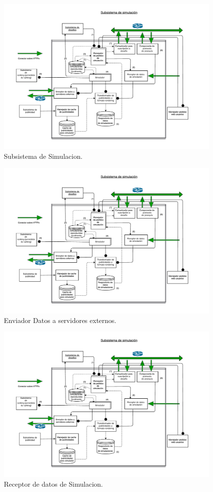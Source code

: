 \begin{figure}[H]
  \includegraphics[width=1.1\textwidth, page=1, clip, trim=10 0 10 0]{imagenes/subs-simulacion.pdf}
  \caption{Subsistema de Simulacion.}
\end{figure}

\begin{figure}[H]
  \includegraphics[width=1.1\textwidth, page=2, clip, trim=25 0 10 0]{imagenes/subs-simulacion.pdf}
  \caption{Enviador Datos a servidores externos.}
\end{figure}

\begin{figure}[H]
  \includegraphics[width=1.1\textwidth, page=3, clip, trim=25 250 10 0]{imagenes/subs-simulacion.pdf}
  \caption{Receptor de datos de Simulacion.}
\end{figure}
